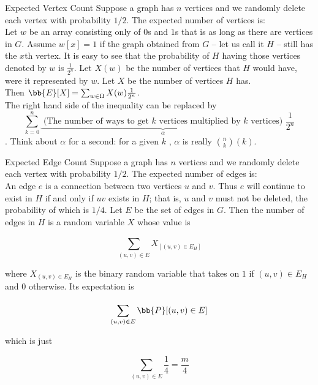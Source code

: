 \documentclass[../main.tex]{subfiles}
\begin{document}
\begin{problem}{Expected Vertex Count}
    Suppose a graph has $n$ vertices and we randomly delete each vertex with probability $1/2$. The expected number of vertices is: \\

    Let $w$ be an array consisting only of $0$s and $1$s that is as long as there are vertices in $G$. Assume $w[x] = 1$ if the graph
    obtained from $G$ -- let us call it $H$ -- still has the $x$th vertex. It is easy to see that the probability of $H$ having those
    vertices denoted by $w$ is $\frac{1}{2^n}.$ Let $X(w)$ be the number of vertices that $H$ would have, were it represented by
    $w$. Let $X$ be the number of vertices $H$ has. \\
    
    Then $\bb{E}[X] = \sum_{w \in \Omega}^{} X(w) \frac{1}{2^n}$.  \\
    
    The right hand side of the inequality can be replaced by 
    $$\sum_{k=0}^{n} \underbrace{\text{ (The number of ways to get $k$ vertices multiplied by $k$ vertices) }}_{\alpha} \frac{1}{2^n}$$. Think about $\alpha$ for a second: for a given $k$ , $\alpha$ is really $\binom{n}{k} (k)$. \\

\end{problem}

\begin{problem}{Expected Edge Count}
    Suppose a graph has $n$ vertices and we randomly delete each vertex with probability $1/2$. The expected number of edges is: \\

    An edge $e$ is a connection between two vertices $u$ and $v$. Thus $e$ will continue to exist in $H$ if and only if $uv$ exists
    in $H$; that is, $u$ and $v$ must not be deleted, the probability of which is $1/4$. Let $E$ be the set of edges in $G$. Then
    the number of edges in $H$ is a random variable $X$ whose value is

    \[
        \sum_{(u,v) \in E}^{}X_[(u,v) \in E_H]
    \]

    where $X_{(u,v) \in E_H}$ is the binary random variable that takes on $1$ if $(u,v) \in E_H$ and $0$ otherwise. Its expectation is


    \[
        \sum_{(u,v) \in E}^{}\bb{P}[(u,v) \in E]
    \]

    which is just 

    \[
        \sum_{(u,v) \in E}^{}\frac{1}{4} = \frac{m}{4}
    \]
    
\end{problem}
\end{document}
